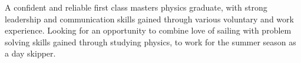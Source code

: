 \begin{cvparagraph}

A confident and reliable first class masters physics graduate, with strong leadership and communication skills gained through various voluntary and work experience. Looking for an opportunity to combine love of sailing with problem solving skills gained through studying physics, to work for the summer season as a day skipper. 
\end{cvparagraph}
